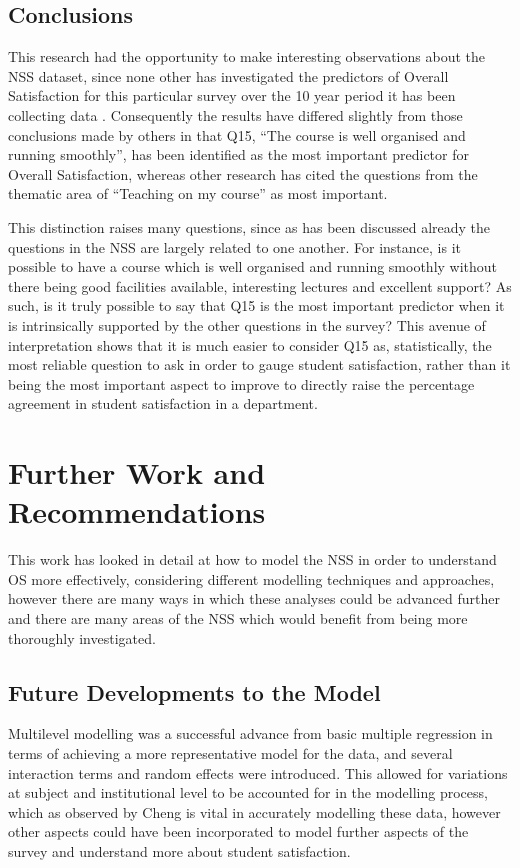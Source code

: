 \documentclass[11pt,a4paper]{report}
\begin{document}
\subsection{Conclusions}
This research had the opportunity to make interesting observations about the NSS dataset, since none other has investigated the predictors of Overall Satisfaction for this particular survey over the 10 year period it has been collecting data \cite{marshandcheng2008,HEFCEreport2014,cheng2010unicoursediffs,denson2010whatpredicts}. Consequently the results have differed slightly from those conclusions made by others in that Q15, ``The course is well organised and running smoothly'', has been identified as the most important predictor for Overall Satisfaction, whereas other research has cited the questions from the thematic area of “Teaching on my course” as most important. 

This distinction raises many questions, since as has been discussed already the questions in the NSS are largely related to one another. For instance, is it possible to have a course which is well organised and running smoothly without there being good facilities available, interesting lectures and excellent support? As such, is it truly possible to say that Q15 is the most important predictor when it is intrinsically supported by the other questions in the survey? This avenue of interpretation shows that it is much easier to consider Q15 as, statistically, the most reliable question to ask in order to gauge student satisfaction, rather than it being the most important aspect to improve to directly raise the percentage agreement in student satisfaction in a department. 


\section{Further Work and Recommendations}
This work has looked in detail at how to model the NSS in order to understand OS more effectively, considering different modelling techniques and approaches, however there are many ways in which these analyses could be advanced further and there are many areas of the NSS which would benefit from being more thoroughly investigated. 

\subsection{Future Developments to the Model}
Multilevel modelling was a successful advance from basic multiple regression in terms of achieving a more representative model for the data, and several interaction terms and random effects were introduced. This allowed for variations at subject and institutional level to be accounted for in the modelling process, which as observed by Cheng \cite{cheng2010unicoursediffs} is vital in accurately modelling these data, however other aspects could have been incorporated to model further aspects of the survey and understand more about student satisfaction. 
\end{document}
